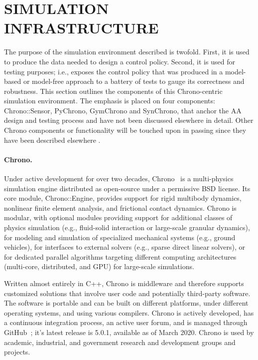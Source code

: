 \documentclass[12pt,twocolumn]{article}
\begin{document}
\section{SIMULATION INFRASTRUCTURE}
\label{sec:simInfrastructure}
The purpose of the simulation environment described is twofold. First, it is used to produce the data needed to design a control policy. Second, it is used for testing purposes; i.e., exposes the control policy that was produced in a model-based or model-free approach to a battery of tests to gauge its correctness and robustness. This section outlines the components of this Chrono-centric simulation environment. The emphasis is placed on four components: Chrono::Sensor, PyChrono, GymChrono and SynChrono, that anchor the AA design and testing process and have not been discussed elsewhere in detail. Other Chrono components or functionality will be touched upon in passing since they have been described elsewhere \cite{chronoOverview2016,ChronoVehicle2019,ChronoSCM2019}.

\paragraph{Chrono.} Under active development for over two decades, Chrono~\cite{chronoOverview2016} is a multi-physics simulation engine distributed as open-source under a permissive BSD license.  Its core module, Chrono::Engine, provides support for rigid multibody dynamics, nonlinear finite element analysis, and frictional contact dynamics. Chrono is modular, with optional modules providing support for additional classes of physics simulation (e.g., fluid-solid interaction or large-scale granular dynamics), for modeling and simulation of specialized mechanical systems (e.g., ground vehicles), for interfaces to external solvers (e.g., sparse direct linear solvers), or for dedicated parallel algorithms targeting different computing architectures (multi-core, distributed, and GPU) for large-scale simulations.

Written almost entirely in C++, Chrono is middleware and therefore supports customized solutions that involve user code and potentially third-party software. The software is portable and can be built on different platforms, under different operating systems, and using various compilers. Chrono is actively developed, has a continuous integration process, an active user forum, and is managed through GitHub~\cite{projectChronoGithub}; it's latest release is 5.0.1, available as of March 2020.  Chrono is used by academic, industrial, and government research and development groups and projects.
\end{document}
